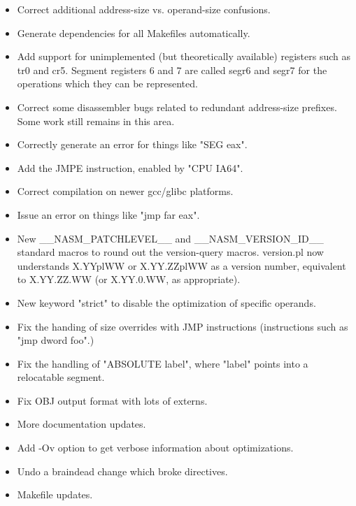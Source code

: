 
\begin{itemize}
    \item{Correct additional address-size vs. operand-size confusions.}
    \item{Generate dependencies for all Makefiles automatically.}
    \item{Add support for unimplemented (but theoretically available)
        registers such as tr0 and cr5. Segment registers 6 and 7 are called
        segr6 and segr7 for the operations which they can be represented.}
    \item{Correct some disassembler bugs related to redundant address-size prefixes.
        Some work still remains in this area.}
    \item{Correctly generate an error for things like "SEG eax".}
    \item{Add the JMPE instruction, enabled by "CPU IA64".}
    \item{Correct compilation on newer gcc/glibc platforms.}
    \item{Issue an error on things like "jmp far eax".}
\end{itemize}


\begin{itemize}
    \item{New \_\_NASM\_PATCHLEVEL\_\_ and \_\_NASM\_VERSION\_ID\_\_ standard macros
        to round out the version-query macros. version.pl now understands
        X.YYplWW or X.YY.ZZplWW as a version number, equivalent to
        X.YY.ZZ.WW (or X.YY.0.WW, as appropriate).}
    \item{New keyword "strict" to disable the optimization of specific operands.}
    \item{Fix the handing of size overrides with JMP instructions
        (instructions such as "jmp dword foo".)}
    \item{Fix the handling of "ABSOLUTE label", where "label" points into a
        relocatable segment.}
    \item{Fix OBJ output format with lots of externs.}
    \item{More documentation updates.}
    \item{Add -Ov option to get verbose information about optimizations.}
    \item{Undo a braindead change which broke  directives.}
    \item{Makefile updates.}
\end{itemize}

